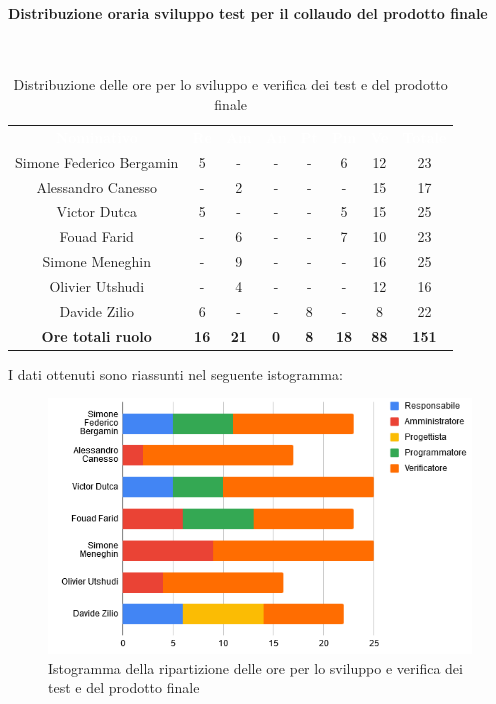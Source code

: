 \paragraph{Distribuzione oraria sviluppo test per il collaudo del prodotto finale}\mbox{} \\
\begin{table}[H]
\centering\renewcommand{\arraystretch}{1.5}
\caption{Distribuzione delle ore per lo sviluppo e verifica dei test e del prodotto finale}
\vspace{0.2cm}
\begin{tabular}{ c c c c c c c c }
\rowcolor{redafk}
\textcolor{white}{\textbf{Nominativo}} & \textcolor{white}{\textbf{Re}} &
\textcolor{white}{\textbf{Am}} & \textcolor{white}{\textbf{An}} &
\textcolor{white}{\textbf{Pt}} & \textcolor{white}{\textbf{Pm}} &
\textcolor{white}{\textbf{Ve}} & \textcolor{white}{\textbf{Totale}} \\
Simone Federico Bergamin & 5 & - & - & - & 6 & 12 & 23 \\
Alessandro Canesso & - & 2 & - & - & - & 15 & 17\\
Victor Dutca & 5 & - & - & - & 5 & 15 & 25 \\
Fouad Farid & - & 6 & - & - & 7 & 10 & 23 \\
Simone Meneghin & - & 9 & - & - & - & 16 & 25 \\
Olivier Utshudi & - & 4 & - & - & - & 12 & 16 \\
Davide Zilio & 6 & - & - & 8 & - & 8 & 22 \\
\rowcolor{lastrowcolor}
\textbf{Ore totali ruolo} & \textbf{16} & \textbf{21} & \textbf{0} & \textbf{8} & \textbf{18} & \textbf{88} & \textbf{151} \\
\end{tabular}
\end{table}

I dati ottenuti sono riassunti nel seguente istogramma:
\begin{figure}[H]
\centering
\includegraphics[scale=0.60]{img/grafici/tabella_test.png}
\caption{Istogramma della ripartizione delle ore per lo sviluppo e verifica dei test e del prodotto finale}
\end{figure}

